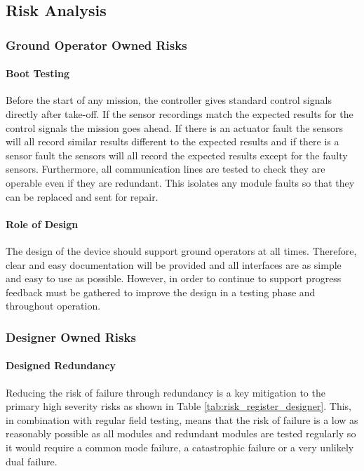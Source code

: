 \subsection{Risk Analysis}\label{sub_section:tgt_risk}
\subsubsection{Ground Operator Owned Risks}\label{sub_sub_section:tgt_ground_operator_risk} 

\paragraph{Boot Testing}
Before the start of any mission, the controller gives standard control signals directly after take-off. If the sensor recordings match the expected results for the control signals the mission goes ahead. If there is an actuator fault the sensors will all record similar results different to the expected results and if there is a sensor fault the sensors will all record the expected results except for the faulty sensors. Furthermore, all communication lines are tested to check they are operable even if they are redundant. This isolates any module faults so that they can be replaced and sent for repair.
\paragraph{Role of Design}
The design of the device should support ground operators at all times. Therefore, clear and easy documentation will be provided and all interfaces are as simple and easy to use as possible. However, in order to continue to support progress feedback must be gathered to improve the design in a testing phase and throughout operation.

\subsubsection{Designer Owned Risks}\label{sub_sub_section:tgt_design_risk}
 
\paragraph{Designed Redundancy}
Reducing the risk of failure through redundancy is a key mitigation to the primary high severity risks as shown in Table \ref{tab:risk_register_designer}. This, in combination with regular field testing, means that the risk of failure is a low as reasonably possible as all modules and redundant modules are tested regularly so it would require a common mode failure, a catastrophic failure or a very unlikely dual failure.

